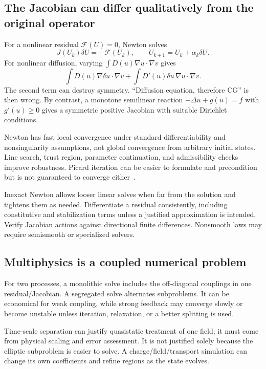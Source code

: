 \documentclass[11pt,a4paper]{article}
\begin{document}
\subsection{The Jacobian can differ qualitatively from the original operator}
For a nonlinear residual $\mathcal F(U)=0$, Newton solves
\begin{equation}
J(U_k)\delta U=-\mathcal F(U_k),\qquad
U_{k+1}=U_k+\alpha_k\delta U.
\end{equation}
For nonlinear diffusion, varying $\int D(u)\nabla u\cdot\nabla v$ gives
\begin{equation}
\int D(u)\nabla\delta u\cdot\nabla v
+\int D'(u)\delta u\,\nabla u\cdot\nabla v.
\end{equation}
The second term can destroy symmetry. ``Diffusion equation, therefore CG'' is then wrong. By contrast, a monotone semilinear reaction $-\Delta u+g(u)=f$ with $g'(u)\ge0$ gives a symmetric positive Jacobian with suitable Dirichlet conditions.

Newton has fast local convergence under standard differentiability and nonsingularity assumptions, not global convergence from arbitrary initial states. Line search, trust region, parameter continuation, and admissibility checks improve robustness. Picard iteration can be easier to formulate and precondition but is not guaranteed to converge either~\cite{petscsnes}.

Inexact Newton allows looser linear solves when far from the solution and tightens them as needed. Differentiate a residual consistently, including constitutive and stabilization terms unless a justified approximation is intended. Verify Jacobian actions against directional finite differences. Nonsmooth laws may require semismooth or specialized solvers.

\subsection{Multiphysics is a coupled numerical problem}
For two processes, a monolithic solve includes the off-diagonal couplings in one residual/Jacobian. A segregated solve alternates subproblems. It can be economical for weak coupling, while strong feedback may converge slowly or become unstable unless iteration, relaxation, or a better splitting is used.

Time-scale separation can justify quasistatic treatment of one field; it must come from physical scaling and error assessment. It is not justified solely because the elliptic subproblem is easier to solve. A charge/field/transport simulation can change its own coefficients and refine regions as the state evolves.
\end{document}

